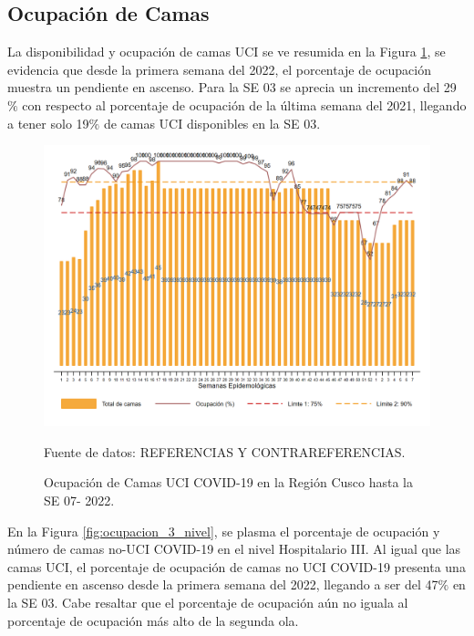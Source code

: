 \documentclass[12pt,a4paper,openany]{book}
\begin{document}
\clearpage
\subsection*{Ocupación de Camas}
\noindent La disponibilidad y ocupación de camas UCI se ve resumida en la Figura \ref{fig:ocupacion_uci}, se evidencia que desde la primera semana del 2022, el porcentaje de ocupación muestra un pendiente en ascenso. Para la SE 03 se aprecia un incremento del 29$\%$ con respecto al porcentaje de ocupación de la última semana del 2021, llegando a tener solo 19$\%$ de camas UCI disponibles en la SE 03.    

\begin{figure}[h]
	\caption{Ocupación de Camas UCI COVID-19 en la Región Cusco hasta la SE 07- 2022.}\label{fig:ocupacion_uci}
	\begin{center}
		\includegraphics[width=0.95\linewidth]{../figuras/uci.png}
	\end{center}
	{\footnotesize {Fuente de datos: REFERENCIAS Y CONTRAREFERENCIAS.}}
\end{figure}
\cleardoublepage

En la Figura \ref{fig:ocupacion_3_nivel}, se plasma el porcentaje de ocupación y número de camas no-UCI COVID-19 en el nivel Hospitalario III. Al igual que las camas UCI, el porcentaje de ocupación de camas no UCI COVID-19 presenta una pendiente en ascenso desde la primera semana del 2022, llegando a ser del  47$\%$ en la SE 03. Cabe resaltar que el porcentaje de ocupación aún no iguala al porcentaje de ocupación más alto de la segunda ola.  
  
\end{document}
